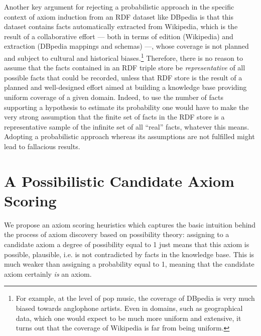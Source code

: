 \documentclass[conference]{IEEEtran}
\begin{document}
Another key argument for rejecting a probabilistic approach in the specific context of axiom induction from an RDF dataset like DBpedia is that this dataset contains facts automatically extracted from Wikipedia,
which is the result of a collaborative effort --- both in terms of edition (Wikipedia) and extraction (DBpedia mappings and schemas) ---, whose coverage is not planned and
subject to cultural and historical biases.\footnote{For example, at the level
of pop music, the coverage of DBpedia is very much biased towards anglophone artists.
Even in domains, such as geographical data, which one would expect to be much more
uniform and extensive, it turns out that the coverage of Wikipedia is far from being uniform.}
Therefore, there is no reason to assume that the facts contained in an RDF triple store
be \emph{representative} of all possible facts that could be recorded, unless
that RDF store is the result of a planned and well-designed effort aimed at building
a knowledge base providing uniform coverage of a given domain.
Indeed, to use the number of facts supporting a hypothesis
to estimate its probability one would have to make the very strong assumption
that the finite set of facts in the RDF store is a representative sample
of the infinite set of all ``real'' facts, whatever this means.
Adopting a probabilistic approach whereas its assumptions are not
fulfilled might lead to fallacious results.



\section{A Possibilistic Candidate Axiom Scoring}
\label{possibility-theory}

We propose an axiom scoring heuristics which captures the basic intuition
behind the process of axiom discovery based on possibility theory: assigning to a candidate axiom a degree of possibility equal to 1 just means that this axiom is possible, plausible, i.e. is not contradicted by facts in the knowledge base. This is  much weaker than assigning a probability equal to 1, meaning that the candidate axiom certainly \textit{is} an axiom.
\end{document}
